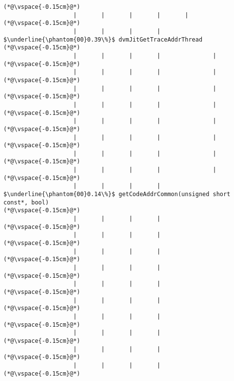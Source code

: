 \begin{lstlisting}[caption=Staattinen metodi C$\to$Java , label=profile:C2JBenchmark00001, numberbychapter=true, frame=lines, float, floatplacement=t]
(*@\vspace{-0.15cm}@*)
                    |       |       |       |       |
(*@\vspace{-0.15cm}@*)
                    |       |       |       |        $\underline{\phantom{00}0.39\%}$ dvmJitGetTraceAddrThread
(*@\vspace{-0.15cm}@*)
                    |       |       |       |               |
(*@\vspace{-0.15cm}@*)
                    |       |       |       |               |
(*@\vspace{-0.15cm}@*)
                    |       |       |       |               |
(*@\vspace{-0.15cm}@*)
                    |       |       |       |               |
(*@\vspace{-0.15cm}@*)
                    |       |       |       |               |
(*@\vspace{-0.15cm}@*)
                    |       |       |       |               |
(*@\vspace{-0.15cm}@*)
                    |       |       |       |               |
(*@\vspace{-0.15cm}@*)
                    |       |       |       |               |
(*@\vspace{-0.15cm}@*)
                    |       |       |       |                $\underline{\phantom{00}0.14\%}$ getCodeAddrCommon(unsigned short const*, bool)
(*@\vspace{-0.15cm}@*)
                    |       |       |       |
(*@\vspace{-0.15cm}@*)
                    |       |       |       |
(*@\vspace{-0.15cm}@*)
                    |       |       |       |
(*@\vspace{-0.15cm}@*)
                    |       |       |       |
(*@\vspace{-0.15cm}@*)
                    |       |       |       |
(*@\vspace{-0.15cm}@*)
                    |       |       |       |
(*@\vspace{-0.15cm}@*)
                    |       |       |       |
(*@\vspace{-0.15cm}@*)
                    |       |       |       |
(*@\vspace{-0.15cm}@*)
                    |       |       |       |
(*@\vspace{-0.15cm}@*)
                    |       |       |       |
(*@\vspace{-0.15cm}@*)

\end{lstlisting}
